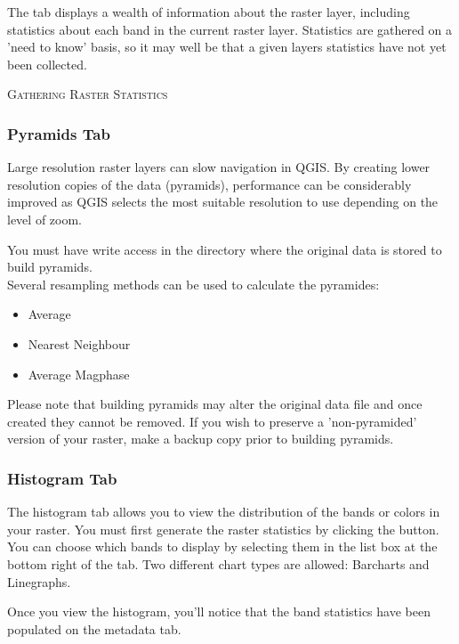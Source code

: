 The  tab displays a wealth of information about the raster layer,
including statistics about each band in the current raster layer. Statistics
are gathered on a 'need to know' basis, so it may well be that a given layers
statistics have not yet been collected.


\begin{Tip}\caption{\textsc{Gathering Raster Statistics}}
\end{Tip}

\subsubsection{Pyramids Tab}\label{raster_pyramids}

Large resolution raster layers can slow navigation in QGIS. By creating lower
resolution copies of the data (pyramids), performance can be considerably
improved as QGIS selects the most suitable resolution to use depending on the
level of zoom.

You must have write access in the directory where the original data is stored
to build pyramids. \\
Several resampling methods can be used to calculate the pyramides:
\begin{itemize}
\item Average
\item Nearest Neighbour
\item Average Magphase
\end{itemize}

Please note that building pyramids may alter the original data file and once
created they cannot be removed. If you wish to preserve a 'non-pyramided'
version of your raster, make a backup copy prior to building pyramids.

\subsubsection{Histogram Tab}\label{raster_histogram}

The histogram tab allows you to view the distribution 
of the bands or colors in your raster. You must first generate the raster statistics 
by clicking the  button. You can choose which bands to display by 
selecting them in the list box at the bottom right of the tab. Two different
chart types are allowed: Barcharts and Linegraphs.

Once you view the histogram, you'll notice that the band statistics have been
populated on the metadata tab.

